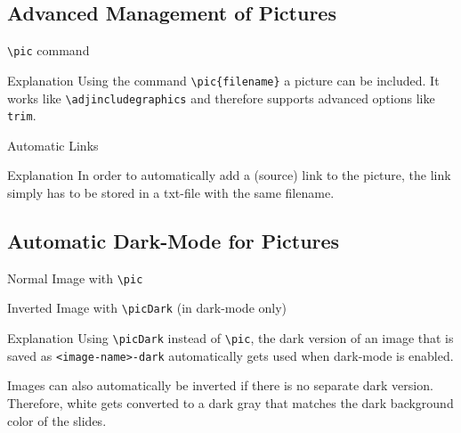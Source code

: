 \documentclass[
	aspectratio=169, %
	8pt, %
]{beamer}
\begin{document}
\subsection{Advanced Management of Pictures}
\begin{frame}{\insertsubsection}
	\begin{fancycolumns}[t]
		\begin{example}{\texttt{\textbackslash pic} command}
			\centering{}
		\end{example}
		\begin{note}{Explanation}
			Using the command \texttt{\textbackslash pic\{filename\}} a picture can be included. It works like \texttt{\textbackslash adjincludegraphics} and therefore supports advanced options like \texttt{trim}.
		\end{note}
	\nextcolumn
		\begin{example}{Automatic Links}
			\centering{} %
		\end{example}
		\begin{note}{Explanation}
			In order to automatically add a (source) link to the picture, the link simply has to be stored in a txt-file with the same filename.
		\end{note}
	\end{fancycolumns}
\end{frame}

\subsection{Automatic Dark-Mode for Pictures}
\begin{frame}{\insertsubsection}
	\begin{fancycolumns}
		\begin{notetight}{Normal Image with \texttt{\textbackslash pic}}
			\centering
		\end{notetight}
	\nextcolumn
		\begin{notetight}{Inverted Image with \texttt{\textbackslash picDark} (in dark-mode only)}
			\centering
		\end{notetight}
	\end{fancycolumns}
	\begin{note}{Explanation}
		Using \texttt{\textbackslash picDark} instead of \texttt{\textbackslash pic}, the dark version of an image that is saved as \texttt{<image-name>-dark} automatically gets used when dark-mode is enabled.

		Images can also automatically be inverted if there is no separate dark version. Therefore, white gets converted to a dark gray that matches the dark background color of the slides.
	\end{note}
\end{frame}
\end{document}
